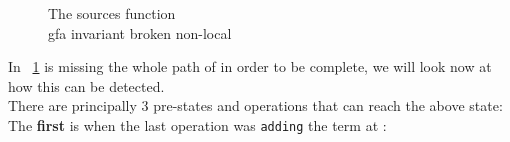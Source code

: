 \begin{figure}[H]

\caption{
The sources function\\
gfa invariant broken non-local
}
\label{snippet3.16a_graph6}
\end{figure}
In ~\ref{snippet3.16a_graph6}  is missing the whole path of  in order to be complete, we will look now at how this can be detected.\\
There are principally 3 pre-states and operations that can reach the above state:\\
The \textbf{first} is when the last operation was \lstinline{adding} the term  at :
